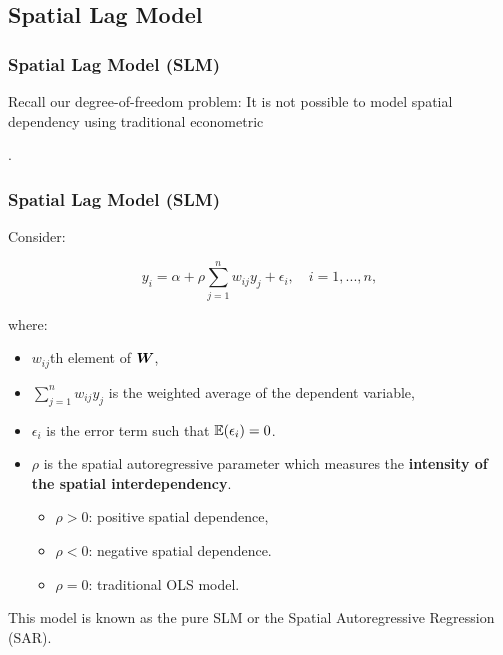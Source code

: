\documentclass[english,10pt]{beamer}\usepackage[]{graphicx}\usepackage[]{xcolor}
\begin{document}
\subsection{Spatial Lag Model}

\begin{frame}
  \frametitle{Spatial Lag Model (SLM)}
    \begin{alertblock}{}
    Recall our degree-of-freedom problem: It is not possible to model spatial dependency using traditional econometric
  \end{alertblock}.
\end{frame}

\begin{frame}
  \frametitle{Spatial Lag Model (SLM)}
  Consider:

\begin{equation}\label{eq:slm_model_1}
y_i = \alpha +\rho \sum_{j = 1}^n w_{ij}y_j + \epsilon_i, \quad i = 1,...,n,
\end{equation}

where:

\begin{itemize}
  \item $w_{ij}$th element of $\bm W$,
  \item $\sum_{j = 1}^n w_{ij}y_j$ is the weighted average of the dependent variable,
  \item $\epsilon_i$ is the error term such that $\mathbb{E}(\epsilon_i) = 0$.
  \item $\rho$ is the spatial autoregressive parameter which measures the \textbf{intensity of the spatial interdependency}.
    \begin{itemize}
      \item $\rho> 0$: positive spatial dependence,
      \item $\rho<0$: negative spatial dependence.
      \item $\rho = 0$: traditional OLS model.
    \end{itemize}
\end{itemize}

\begin{alertblock}{}
This model is known as the \alert{pure SLM} or \alert{the Spatial Autoregressive Regression (SAR)}.
\end{alertblock}
\end{frame}
\end{document}
